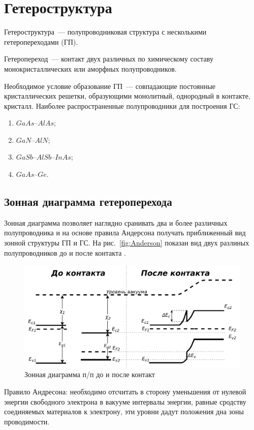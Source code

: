 \section{Гетероструктура}
Гетероструктура~--- полупроводниковая структура с несколькими гетеропереходами (ГП). 

Гетеропереход~--- контакт двух различных по химическому составу монокристаллических или аморфных полупроводников.

Необходимое условие образование ГП~--- совпадающие постоянные кристаллических решетки, образующими монолитный, однородный в контакте, кристалл.
Наиболее распространенные полупроводники для построения ГС:
\begin{enumerate}
  \item $GaAs$--$AlAs$;
  \item $GaN$--$AlN$;
  \item $GaSb$--$AlSb$--$InAs$;
  \item $GaAs$--$Ge$.
\end{enumerate}

\subsection{Зонная диаграмма гетероперехода}
Зонная диаграмма позволяет наглядно сранивать два и более различных полупроводника и на основе правила Андерсона получать приближенный вид зонной структуры ГП и ГС. На рис.~\ref{fig:Anderson} показан вид двух разлиных полупроводников до и после контакта \cite{Usanov}.

\begin{figure}[h]
	\centering
	\includegraphics[width=.9\linewidth]{assets/HJ}
	\caption{Зонная диаграмма п/п до и после контакт}
	\label{fig:zone}
\end{figure}

Правило Андресона: необходимо отсчитать в сторону уменьшения от нулевой энергии свободного электрона в вакууме интервалы энергии, равные сродству соединяемых материалов к электрону, эти уровни дадут положения дна зоны проводимости.

